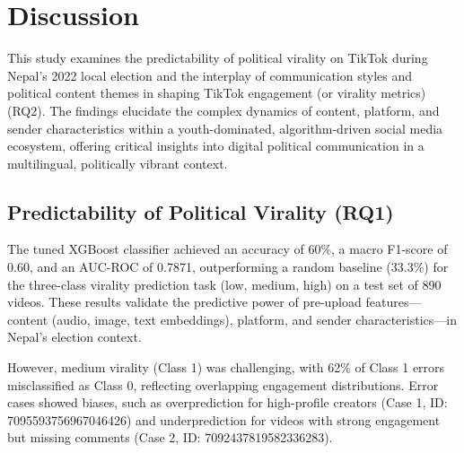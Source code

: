 \documentclass[12pt,a4paper]{report}
\begin{document}

\chapter{Discussion}
\label{chap:discussion}

This study examines the predictability of political virality on TikTok during Nepal’s 2022 local election and the interplay of communication styles and political content themes in shaping TikTok engagement (or virality metrics) (RQ2). The findings elucidate the complex dynamics of content, platform, and sender characteristics within a youth-dominated, algorithm-driven social media ecosystem, offering critical insights into digital political communication in a multilingual, politically vibrant context.

\section{Predictability of Political Virality (RQ1)}
\label{sec:rq1_discussion}
The tuned XGBoost classifier achieved an accuracy of 60\%, a macro F1-score of 0.60, and an AUC-ROC of 0.7871, outperforming a random baseline (33.3\%) for the three-class virality prediction task (low, medium, high) on a test set of 890 videos. These results validate the predictive power of pre-upload features—content (audio, image, text embeddings), platform, and sender characteristics—in Nepal's election context.

However, medium virality (Class 1) was challenging, with 62\% of Class 1 errors misclassified as Class 0, reflecting overlapping engagement distributions. Error cases showed biases, such as overprediction for high-profile creators (Case 1, ID: 7095593756967046426) and underprediction for videos with strong engagement but missing comments (Case 2, ID: 7092437819582336283). 

\end{document}
